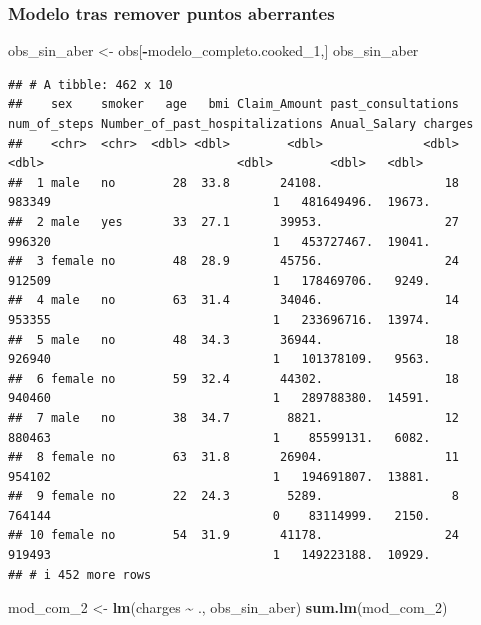 \documentclass[
]{article}
\newenvironment{Shaded}{\begin{snugshade}}{\end{snugshade}}
\newcommand{\FunctionTok}[1]{\textcolor[rgb]{0.13,0.29,0.53}{\textbf{#1}}}
\newcommand{\NormalTok}[1]{#1}
\newcommand{\OtherTok}[1]{\textcolor[rgb]{0.56,0.35,0.01}{#1}}
\newcommand{\SpecialCharTok}[1]{\textcolor[rgb]{0.81,0.36,0.00}{\textbf{#1}}}
\begin{document}
\subsubsection{Modelo tras remover puntos
aberrantes}\label{modelo-tras-remover-puntos-aberrantes}

\begin{Shaded}
\begin{Highlighting}[]
\NormalTok{obs\_sin\_aber }\OtherTok{\textless{}{-}}\NormalTok{ obs[}\SpecialCharTok{{-}}\NormalTok{modelo\_completo.cooked\_1,]}
\NormalTok{obs\_sin\_aber}
\end{Highlighting}
\end{Shaded}

\begin{verbatim}
## # A tibble: 462 x 10
##    sex    smoker   age   bmi Claim_Amount past_consultations num_of_steps Number_of_past_hospitalizations Anual_Salary charges
##    <chr>  <chr>  <dbl> <dbl>        <dbl>              <dbl>        <dbl>                           <dbl>        <dbl>   <dbl>
##  1 male   no        28  33.8       24108.                 18       983349                               1   481649496.  19673.
##  2 male   yes       33  27.1       39953.                 27       996320                               1   453727467.  19041.
##  3 female no        48  28.9       45756.                 24       912509                               1   178469706.   9249.
##  4 male   no        63  31.4       34046.                 14       953355                               1   233696716.  13974.
##  5 male   no        48  34.3       36944.                 18       926940                               1   101378109.   9563.
##  6 female no        59  32.4       44302.                 18       940460                               1   289788380.  14591.
##  7 male   no        38  34.7        8821.                 12       880463                               1    85599131.   6082.
##  8 female no        63  31.8       26904.                 11       954102                               1   194691807.  13881.
##  9 female no        22  24.3        5289.                  8       764144                               0    83114999.   2150.
## 10 female no        54  31.9       41178.                 24       919493                               1   149223188.  10929.
## # i 452 more rows
\end{verbatim}

\begin{Shaded}
\begin{Highlighting}[]
\NormalTok{mod\_com\_2 }\OtherTok{\textless{}{-}} \FunctionTok{lm}\NormalTok{(charges }\SpecialCharTok{\textasciitilde{}}\NormalTok{ ., obs\_sin\_aber)}
\FunctionTok{sum.lm}\NormalTok{(mod\_com\_2)}
\end{Highlighting}
\end{Shaded}
\end{document}
